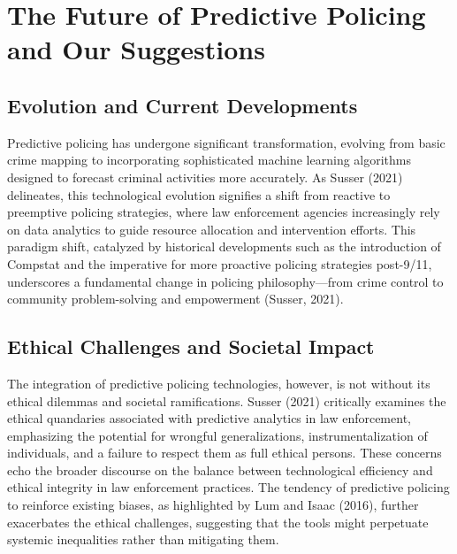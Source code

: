 \documentclass[man, noextraspace]{apa7} %
\begin{document}
\section{The Future of Predictive Policing and Our Suggestions}
\subsection{Evolution and Current Developments}
Predictive policing has undergone significant transformation, evolving from basic crime mapping to incorporating sophisticated machine learning algorithms designed to forecast criminal activities more accurately. As Susser (2021) delineates, this technological evolution signifies a shift from reactive to preemptive policing strategies, where law enforcement agencies increasingly rely on data analytics to guide resource allocation and intervention efforts. This paradigm shift, catalyzed by historical developments such as the introduction of Compstat and the imperative for more proactive policing strategies post-9/11, underscores a fundamental change in policing philosophy—from crime control to community problem-solving and empowerment (Susser, 2021).

\subsection{Ethical Challenges and Societal Impact}
The integration of predictive policing technologies, however, is not without its ethical dilemmas and societal ramifications. Susser (2021) critically examines the ethical quandaries associated with predictive analytics in law enforcement, emphasizing the potential for wrongful generalizations, instrumentalization of individuals, and a failure to respect them as full ethical persons. These concerns echo the broader discourse on the balance between technological efficiency and ethical integrity in law enforcement practices. The tendency of predictive policing to reinforce existing biases, as highlighted by Lum and Isaac (2016), further exacerbates the ethical challenges, suggesting that the tools might perpetuate systemic inequalities rather than mitigating them.
\end{document}
